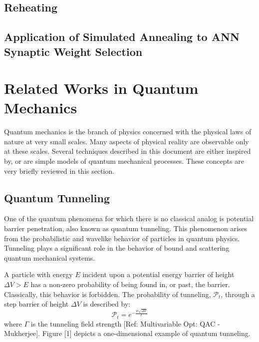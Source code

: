 \documentclass[11pt]{afthesis}
\begin{document}
\subsection{Reheating}

\subsection{Application of Simulated Annealing to ANN Synaptic Weight Selection}


\section{Related Works in Quantum Mechanics}


Quantum mechanics is the branch of physics concerned with the physical laws of nature at very small scales. Many aspects of physical reality are observable only at these scales. Several techniques described in this document are either inspired by, or are simple models of quantum mechanical processes. These concepts are very briefly reviewed in this section. 

\subsection{Quantum Tunneling} 



One of the quantum phenomena for which there is no classical analog is potential barrier penetration, also known as quantum tunneling. This phenomenon arises from the probabilistic and wavelike behavior of particles in quantum physics. Tunneling plays a significant role in the behavior of bound and scattering quantum mechanical systems.

A particle with energy \begin{math} E \end{math} incident upon a potential energy barrier of height \begin{math} \Delta V > E  \end{math} has a non-zero probability of being found in, or past, the barrier. Classically, this behavior is forbidden. The probability of tunneling, \begin{math} \mathcal{P}_t \end{math}, through a step barrier of height \begin{math} \Delta V  \end{math} is described by: 
\begin{equation}
\mathcal{P}_t = e^{-\frac{w \sqrt{\Delta V}}{ \Gamma}} 
\end{equation} where \begin{math} \Gamma \end{math} is the tunneling field strength [Ref: Multivariable Opt: QAC - Mukherjee]. Figure [1] depicts a one-dimensional example of quantum tunneling.
\end{document}

